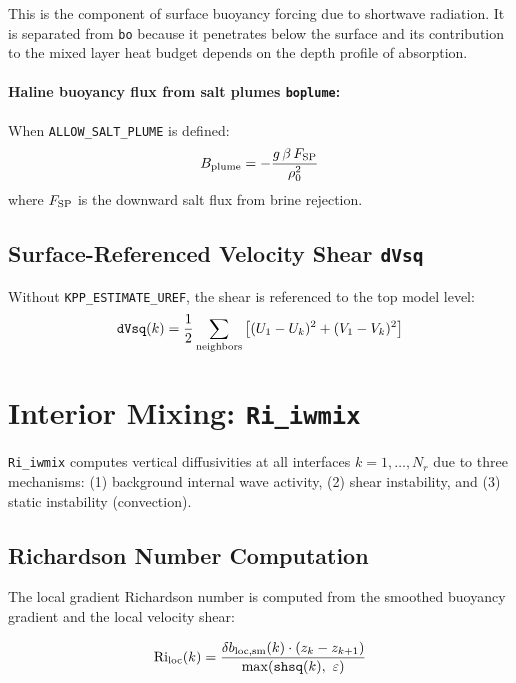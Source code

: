 \documentclass[12pt,letterpaper]{article}
\newcommand{\Ri}{\mathrm{Ri}}
\begin{document}
This is the component of surface buoyancy forcing due to shortwave  
radiation. It is separated from \texttt{bo} because it penetrates  
below the surface and its contribution to the mixed layer heat budget  
depends on the depth profile of absorption.  
  
\paragraph{Haline buoyancy flux from salt plumes \texttt{boplume}:}  
When \texttt{ALLOW\_SALT\_PLUME} is defined:  
\begin{equation}  
B_{\rm plume} = -\frac{g\,\beta\,F_{\rm SP}}{\rho_0^2}  
\end{equation}  
where $F_{\rm SP}$ is the downward salt flux from brine rejection.  
  
\subsection{Surface-Referenced Velocity Shear \texttt{dVsq}}  
  
Without \texttt{KPP\_ESTIMATE\_UREF}, the shear is referenced to the  
top model level:  
\begin{equation}  
\texttt{dVsq}(k) = \frac{1}{2}\sum_{\rm neighbors}  
\left[(U_1 - U_k)^2 + (V_1 - V_k)^2\right]  
\end{equation}  
  
\section{Interior Mixing: \texttt{Ri\_iwmix}}  
  
\texttt{Ri\_iwmix} computes vertical diffusivities at all interfaces  
$k = 1, \ldots, N_r$ due to three mechanisms: (1) background internal  
wave activity, (2) shear instability, and (3) static instability  
(convection).  
  
\subsection{Richardson Number Computation}  
  
The local gradient Richardson number is computed from the smoothed  
buoyancy gradient and the local velocity shear:  
  
\begin{equation}  
\Ri_{\rm loc}(k) = \frac{\delta b_{\rm loc,sm}(k) \cdot  
(z_k - z_{k+1})}{\max(\texttt{shsq}(k),\ \varepsilon)}  
\end{equation}  
  
\end{document}
